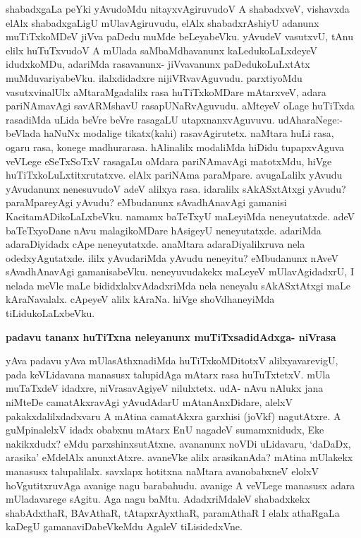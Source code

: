 \noindent
shabadxgaLa peYki yAvudoMdu nitayxvAgiruvudoV A shabadxveV, vishavxda elAlx shabadx\-gaLigU mUlavAgi\-ruvudu, elAlx shabadxrAshiyU adanunx muTiTxkoMDeV jiVva paDedu muMde beLeyabeVku. yAvudeV vasutxvU, tAnu elilx huTuTxvudoV A mUlada saMbaMdhavanunx kaLedukoLaLxdeyeV idudxkoMDu, ada\-riMda rasavanunx- jiVvavanunx paDedukoLuLxtAtx muMduvariyabeVku. ilalxdidadxre nijiVRvavAgu\-vudu. parxtiyoMdu vasutxvinalUlx aMtaraMgadalilx rasa huTiTxkoMDare mAtarxveV, adara pariNAmavAgi savARM\-shavU rasapUNaRvAguvudu. aMteyeV oLage huTiTxda rasadiMda uLida beVre beVre rasagaLU utapxnanx\-vAguvuvu. udAharaNege:- beVlada haNuNx modalige tikatx(kahi) rasavAgirutetx. naMtara huLi rasa, ogaru\- rasa, konege madhurarasa. hAlinalilx modaliMda hiDidu tupapxvAguva veVLege eSeTxSoTxV rasagaLu oMdara\- pariNAmavAgi matotxMdu, hiVge huTiTxkoLuLxtitxrutatxve. elAlx pariNAma paraMpare. avugaLalilx yAvudu yAvudanunx nenesuvudoV adeV alilxya rasa. idaralilx sAkASxtAtxgi yAvudu? paraMpareyAgi yAvu\-du? eMbudanunx sAvadhAnavAgi gamanisi KacitamADikoLaLxbeVku. namamx baTeTxyU maLeyiMda neneyutatxde. adeV baTeTxyoDane nAvu malagikoMDare hAsigeyU neneyutatxde. adariMda adaraDiyidadx cApe neneyutatxde. anaMtara adaraDiyalilxruva nela odedxyAgutatxde. ililx yAvudariMda yAvudu nene\-yitu? eMbudanunx nAveV sAvadhAnavAgi gamanisabeVku. neneyuvudakekx maLeyeV mUlavAgidadxrU, I nelada meVle maLe bididxlalxvAdadxriMda nela neneyalu sAkASxtAtxgi maLe kAraNavalalx. cApeyeV alilx kAraNa. hiVge shoVdhaneyiMda tiLidukoLaLxbeVku.

{\bigskip
\noindent
{\large\bf padavu tananx huTiTxna neleyanunx muTiTxsadidAdxga- niVrasa}}\label{page182}
\medskip

\noindent
yAva padavu yAva mUlasAthxnadiMda huTiTxkoMDitotxV alilxyavarevigU, pada keVLidavana mana\-susx talupidAga mAtarx rasa huTuTxtetxV. mUla muTaTxdeV idadxre, niVrasavAgiyeV nilulxtetx. udA- nAvu nAlukx jana niMteDe camatAkxravAgi yAvudAdarU mAtanAnxDidare, alelxV pakakxdalilxdadxvaru A mAtina camatAkxra garxhisi (joVkf) nagutAtxre. A guMpinalelxV idadx obabxnu mAtarx EnU nagadeV sumamxnidudx, Eke nakikxdudx? eMdu parxshinxsutAtxne. avananunx noVDi uLidavaru, `daDaDx, arasika' eMdelAlx anunxtAtxre. avaneVke alilx arasikanAda? mAtina mUlakekx manasusx talupalilalx. savxlapx hotitxna naMtara avanobabxneV elolxV hoVgutitxruvAga avanige nagu barabahudu. avanige A veVLege manasusx adara mUladavarege sAgitu. Aga nagu baMtu. AdadxriMdaleV shabadxkekx shabAdxthaR, BAvAthaR, tAtapxrAyxthaR, paramAthaR I elalx athaRgaLa kaDegU gamanaviDabeVkeMdu AgaleV tiLisidedxVne.

